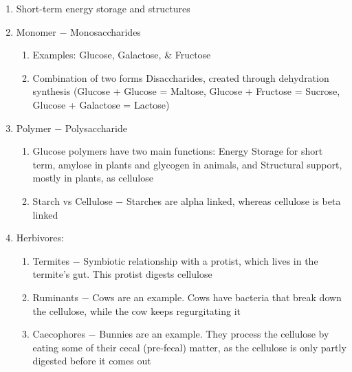 \documentclass[12pt]{article}
\begin{document}
\begin{itemize}
\begin{enumerate}
      \item Short-term energy storage and structures

      \item Monomer $-$ Monosaccharides

        \begin{enumerate}

          \item Examples: Glucose, Galactose, \& Fructose

          \item Combination of two forms Disaccharides, created through dehydration synthesis (Glucose + Glucose = Maltose, Glucose + Fructose = Sucrose, Glucose + Galactose = Lactose)

        \end{enumerate}

      \item Polymer $-$ Polysaccharide

        \begin{enumerate}

          \item Glucose polymers have two main functions: Energy Storage for short term, amylose in plants and glycogen in animals, and Structural support, mostly in plants, as cellulose

          \item Starch vs Cellulose $-$ Starches are alpha linked, whereas cellulose is beta linked

        \end{enumerate}

      \item Herbivores:

        \begin{enumerate}

          \item Termites $-$ Symbiotic relationship with a protist, which lives in the termite's gut. This protist digests cellulose

          \item Ruminants $-$ Cows are an example. Cows have bacteria that break down the cellulose, while the cow keeps regurgitating it

          \item Caecophores $-$ Bunnies are an example. They process the cellulose by eating some of their cecal (pre-fecal) matter, as the cellulose is only partly digested before it comes out

        \end{enumerate}


\end{enumerate}
\end{itemize}
\end{document}
